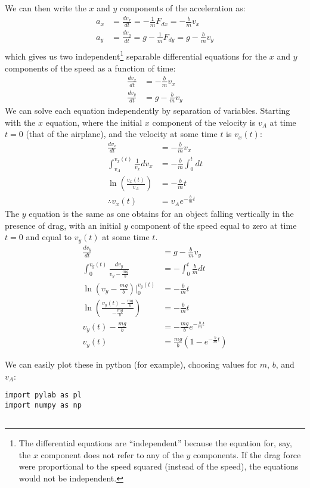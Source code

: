 \begin{solution}
\begin{parts}
We can then write the $x$ and $y$ components of the acceleration as:
\begin{align*}
a_x&=\frac{dv_x}{dt}=-\frac{1}{m}F_{dx}=-\frac{b}{m}v_x\\
a_y&=\frac{dv_y}{dt}=g -\frac{1}{m}F_{dy}=g-\frac{b}{m}v_y\\
\end{align*}
which gives us two independent\footnote{The differential equations are ``independent'' because the equation for, say, the $x$ component does not refer to any of the $y$ components. If the drag force were proportional to the speed squared (instead of the speed), the equations would not be independent.} separable differential equations for the $x$ and $y$ components of the speed as a function of time:
\begin{align*}
\frac{dv_x}{dt} &=-\frac{b}{m}v_x\\
\frac{dv_y}{dt} &= g-\frac{b}{m}v_y
\end{align*}
We can solve each equation independently by separation of variables. Starting with the $x$ equation, where the initial $x$ component of the velocity is $v_A$ at time $t=0$ (that of the airplane), and the velocity at some time $t$ is $v_x(t)$:
\begin{align*}
\frac{dv_x}{dt} &=-\frac{b}{m}v_x \\
\int_{v_A}^{v_x(t)}\frac{1}{v_x} dv_x&=-\frac{b}{m}\int_0^t dt\\
\ln\left( \frac{v_x(t)}{v_A} \right)&=-\frac{b}{m}t\\
\therefore v_x(t)&=v_A e^{-\frac{b}{m}t}
\end{align*}
The $y$ equation is the same as one obtains for an object falling vertically in the presence of drag, with an initial $y$ component of the speed equal to zero at time $t=0$ and equal to $v_y(t)$ at some time $t$.
\begin{align*}
\frac{dv_y}{dt} &= g-\frac{b}{m}v_y\\
\int_0^{v_y(t)} \frac{dv_y}{v_y-\frac{mg}{b}}&=-\int_0^t\frac{b}{m}dt\\
\ln\left( v_y-\frac{mg}{b} \right)\Bigr|_0^{v_y(t)}&=-\frac{b}{m}t\\
\ln\left( \frac{v_y(t)-\frac{mg}{b}}{-\frac{mg}{b}} \right)&=-\frac{b}{m}t\\
v_y(t)-\frac{mg}{b} &=-\frac{mg}{b}e^{-\frac{b}{m}t}\\
v_y(t)&=\frac{mg}{b}\left(1-e^{-\frac{b}{m}t}\right)
\end{align*}
\item We can easily plot these in python (for example), choosing values for $m$, $b$, and $v_A$:
\begin{verbatim}
import pylab as pl
import numpy as np


\end{verbatim}
\end{parts}
\end{solution}
